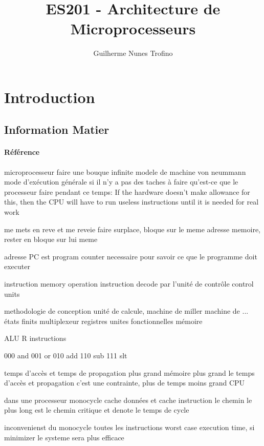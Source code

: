 \documentclass{article}
\title{ES201 - Architecture de Microprocesseurs}
\author{Guilherme Nunes Trofino}
\begin{document}
\maketitle
\setlength{\parindent}{0pt}

\newpage\tableofcontents

\section{Introduction}


\subsection{Information Matier}
\paragraph{Référence}


microprocesseur faire une bouque infinite
modele de machine von neummann
mode d'exécution générale
si il n'y a pas des taches à faire qu'est-ce que le processeur faire pendant ce temps: If the hardware doesn't make allowance for this, then the CPU will have to run useless instructions until it is needed for real work

me mets en reve et me reveie 
faire surplace, bloque sur le meme adresse memoire, rester en bloque sur lui meme

adresse PC est program counter necessaire pour savoir ce que le programme doit executer

instruction memory
operation instruction decode par l'unité de contrôle control units


methodologie de conception
unité de calcule, machine de miller machine de ... états finits
multiplexeur
registres
unites fonctionnelles
mémoire

ALU
R instructions

000 and
001 or
010 add
110 sub
111 slt


temps d'accès et temps de propagation
plus grand mémoire plus grand le temps d'accès et propagation c'est une contrainte, plus de temps moins grand CPU


dans une processeur monocycle
cache données et cache instruction
le chemin le plus long est le chemin critique et denote le temps de cycle

inconvenienst du monocycle
toutes les instructions
worst case execution time, si minimizer le systeme sera plus efficace
\end{document}
